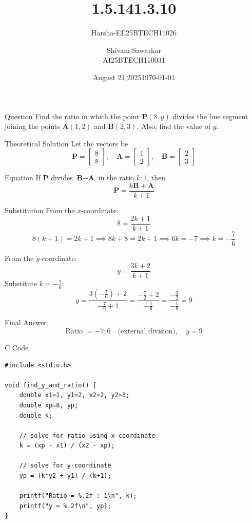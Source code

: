 \documentclass{beamer}
\title %
{1.5.14}
\date{August 21,2025}
\author %
{Harsha-EE25BTECH11026}
\title{1.3.10}
\author{Shivam Sawarkar \\ AI25BTECH110031}
\date{\today}
\begin{document}
\frame{\titlepage}

\begin{frame}{Question}
Find the ratio in which the point $\textbf{P}(8,y)$ divides the line segment joining the points 
$\textbf{A}(1,2)$ and $\textbf{B}(2,3)$. Also, find the value of $y$.
\end{frame}

\begin{frame}{Theoretical Solution}
Let the vectors be
\[
\textbf{P} = \begin{bmatrix} 8 \\ y \end{bmatrix}, \quad
\textbf{A} = \begin{bmatrix} 1 \\ 2 \end{bmatrix}, \quad
\textbf{B} = \begin{bmatrix} 2 \\ 3 \end{bmatrix}
\]
\end{frame}

\begin{frame}{Equation}
If \textbf{P} divides $\textbf{B} - \textbf{A}$ in the ratio $k:1$, then
\[
\textbf{P} = \frac{k\textbf{B} + \textbf{A}}{k+1}
\]
\end{frame}

\begin{frame}{Substitution}
From the $x$-coordinate:
\[
8 = \frac{2k+1}{k+1}
\]
\[
8(k+1) = 2k+1 \implies 8k+8 = 2k+1 \implies 6k = -7 \implies k = -\frac{7}{6}
\]

From the $y$-coordinate:
\[
y = \frac{3k+2}{k+1}
\]
Substitute $k = -\tfrac{7}{6}$:
\[
y = \frac{3(-\tfrac{7}{6}) + 2}{-\tfrac{7}{6}+1} = \frac{-\tfrac{7}{2} + 2}{-\tfrac{1}{6}} = \frac{-\tfrac{3}{2}}{-\tfrac{1}{6}} = 9
\]
\end{frame}

\begin{frame}{Final Answer}
\[
\text{Ratio } = -7:6 \quad \text{(external division)}, \quad y = 9
\]
\end{frame}

\begin{frame}[fragile]{C Code}
\begin{verbatim}
#include <stdio.h>

void find_y_and_ratio() {
    double x1=1, y1=2, x2=2, y2=3;
    double xp=8, yp;
    double k;

    // solve for ratio using x-coordinate
    k = (xp - x1) / (x2 - xp);

    // solve for y-coordinate
    yp = (k*y2 + y1) / (k+1);

    printf("Ratio = %.2f : 1\n", k);
    printf("y = %.2f\n", yp);
}
\end{verbatim}
\end{frame}
\end{document}
